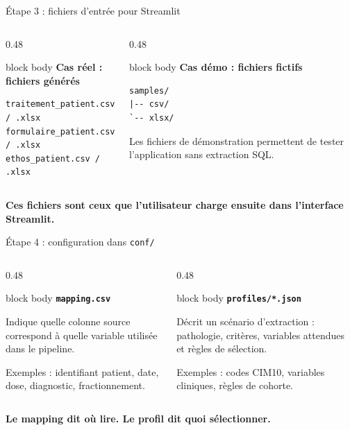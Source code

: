 \documentclass[10pt,aspectratio=169]{beamer}
\newenvironment{infobox}[1]
{\begin{beamercolorbox}[rounded=true,shadow=false,wd=\linewidth,sep=0.8em]{block body}
\textbf{\color{DarkBlue}#1}\par\vspace{0.3em}}
{\end{beamercolorbox}}
\begin{document}
\begin{frame}[fragile]{Étape 3 : fichiers d'entrée pour Streamlit}
\begin{columns}[T,onlytextwidth]
\begin{column}{0.48\linewidth}
\begin{infobox}{Cas réel : fichiers générés}
\begin{lstlisting}
traitement_patient.csv / .xlsx
formulaire_patient.csv / .xlsx
ethos_patient.csv / .xlsx
\end{lstlisting}
\end{infobox}
\end{column}

\begin{column}{0.48\linewidth}
\begin{infobox}{Cas démo : fichiers fictifs}
\begin{lstlisting}
samples/
|-- csv/
`-- xlsx/
\end{lstlisting}
Les fichiers de démonstration permettent de tester l'application sans extraction SQL.
\end{infobox}
\end{column}
\end{columns}

\vfill
\centering
\textbf{Ces fichiers sont ceux que l'utilisateur charge ensuite dans l'interface Streamlit.}
\end{frame}

\begin{frame}{Étape 4 : configuration dans \texttt{conf/}}
\begin{columns}[T,onlytextwidth]
\begin{column}{0.48\linewidth}
\begin{infobox}{\texttt{mapping.csv}}
Indique quelle colonne source correspond à quelle variable utilisée dans le pipeline.

\vspace{0.4em}
Exemples : identifiant patient, date, dose, diagnostic, fractionnement.
\end{infobox}
\end{column}

\begin{column}{0.48\linewidth}
\begin{infobox}{\texttt{profiles/*.json}}
Décrit un scénario d'extraction : pathologie, critères, variables attendues et règles de sélection.

\vspace{0.4em}
Exemples : codes CIM10, variables cliniques, règles de cohorte.
\end{infobox}
\end{column}
\end{columns}

\vfill
\centering
\textbf{Le mapping dit où lire. Le profil dit quoi sélectionner.}
\end{frame}
\end{document}
